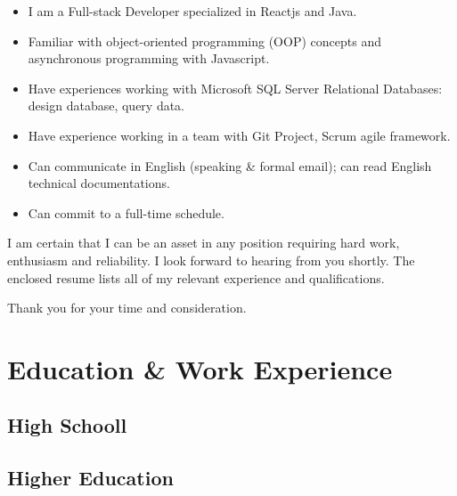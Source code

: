 \documentclass[11pt,a4paper,sans]{moderncv}        %
\begin{document}
\begin{itemize}
  \item I am a Full-stack Developer specialized in Reactjs and Java.
  \item Familiar with object-oriented programming (OOP) concepts and asynchronous programming with Javascript.
  \item Have experiences working with Microsoft SQL Server Relational Databases: design database, query data. %
  \item Have experience working in a team with Git Project, Scrum agile framework.
  \item Can communicate in English (speaking \& formal email); can read English technical documentations.
  \item Can commit to a full-time schedule.
\end{itemize}

I am certain that I can be an asset in any position requiring hard work, enthusiasm and reliability. I look forward to hearing from you shortly. The enclosed resume lists all of my relevant experience and qualifications.

Thank you for your time and consideration.

\makeletterclosing

\newpage


\makecvtitle

\section{Education \& Work Experience}

\subsection{High Schooll}


\subsection{Higher Education}
\end{document}
